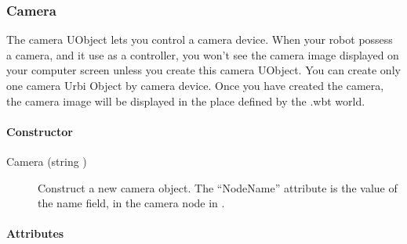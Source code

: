 \subsubsection{Camera}

The camera UObject lets you control a \webots camera device. When your
robot possess a camera, and it use \urbi as a controller, you won't
see the camera image displayed on your computer screen unless you
create this camera UObject. You can create only one camera Urbi Object
by \webots camera device. Once you have created the camera, the camera
image will be displayed in the place defined by the .wbt world.


\paragraph{Constructor}

\noindent
\begin{description}
\item[{Camera (string )}] Construct a new camera
  object. The ``NodeName'' attribute is the value of the name field,
  in the camera node in \webots.
\end{description}

\paragraph{Attributes}

